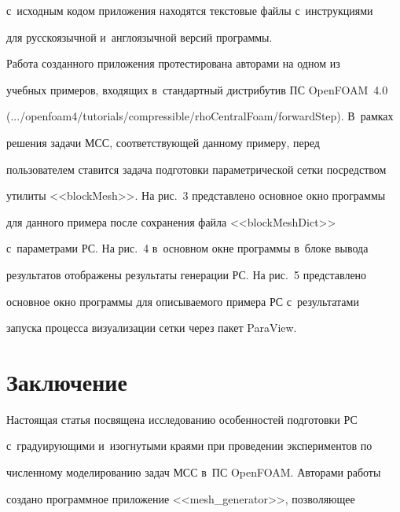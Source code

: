 с~исходным кодом приложения находятся текстовые файлы с~инструкциями 


для русскоязычной и~англоязычной версий программы.


  


  Работа созданного приложения протестирована авторами на одном из 


учебных примеров, входящих в~стандартный дистрибутив ПС OpenFOAM~4.0 


({\sf .../openfoam4/tutorials/compressible/rhoCentralFoam/forwardStep}). В~рамках 


решения задачи МСС, соответствующей данному примеру, перед 


пользователем ставится задача подготовки параметрической сетки посредством 


утилиты <<blockMesh>>. На рис.~3 представлено основное окно программы 


для данного примера после сохранения файла <<blockMeshDict>> 


с~параметрами РС. На рис.~4 в~основном окне программы в~блоке вывода 


результатов отображены результаты генерации РС. На рис.~5 представлено 


основное окно программы для описываемого примера РС с~результатами 


запуска процесса визуализации сетки через пакет ParaView.


  


 


  


 





\section{Заключение}





  Настоящая статья посвящена исследованию особенностей подготовки РС 


с~градуирующими и~изогнутыми краями при проведении экспериментов по 


чис\-лен\-но\-му моделированию задач МСС в~ПС OpenFOAM. Авторами работы 


создано программное приложение <<mesh\_generator>>, позволяющее 


